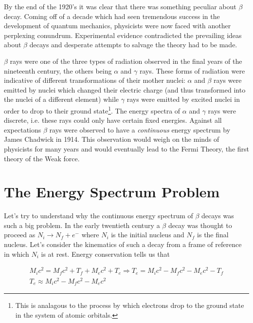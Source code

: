 \documentclass[12pt]{book}
\begin{document}
By the end of the 1920's it was clear that there was something peculiar about $\beta$ decay. Coming off of a decade which had seen tremendous success in the development of quantum mechanics, physicists were now faced with another perplexing conundrum. Experimental evidence contradicted the prevailing ideas about $\beta$ decays and desperate attempts to salvage the theory had to be made.

$\beta$ rays were one of the three types of radiation observed in the final years of the nineteenth century, the others being $\alpha$ and $\gamma$ rays. These forms of radiation were indicative of different transformations of their mother nuclei: $\alpha$ and $\beta$ rays were emitted by nuclei which changed their electric charge (and thus transformed into the nuclei of a different element) while $\gamma$ rays were emitted by excited nuclei in order to drop to their ground state\footnote{This is analagous to the process by which electrons drop to the ground state in the system of atomic orbitals.}. The energy spectra of $\alpha$ and $\gamma$ rays were discrete, i.e. these rays could only have certain fixed energies. Against all expectations $\beta$ rays were observed to have a \emph{continuous} energy spectrum by James Chadwick in 1914. This observation would weigh on the minds of physicists for many years and would eventually lead to the Fermi Theory, the first theory of the Weak force.

\section{The Energy Spectrum Problem}

\paragraph*{}Let's try to understand why the continuous energy spectrum of $\beta$ decays was such a big problem. In the early twentieth century a $\beta$ decay was thought to proceed as $N_{i}\longrightarrow N_{f}+e^{-}$ where $N_{i}$ is the initial nucleus and $N_{f}$ is the final nucleus. Let's consider the kinematics of such a decay from a frame of reference in which $N_{i}$ is at rest. Energy conservation tells us that

\begin{multline}
 M_{i}c^{2}=M_{f}c^{2}+T_{f}+M_{e}c^{2}+T_{e} \Rightarrow T_{e}=M_{i}c^{2}-M_{f}c^{2}-M_{e}c^{2}-T_{f} \\  T_{e}\approx M_{i}c^{2}-M_{f}c^{2}-M_{e}c^{2}
\end{multline}
\end{document}
